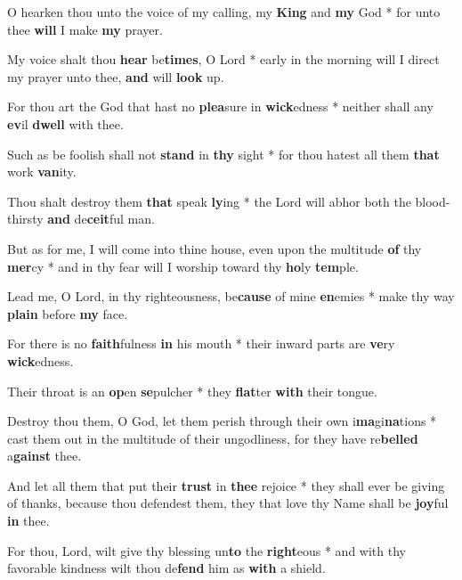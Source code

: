 \begin{multicols}{2}
	O hearken thou unto the voice of my calling, my \textbf{King} and \textbf{my} God * for unto thee \textbf{will} I make \textbf{my} prayer.
	
	My voice shalt thou \textbf{hear} be\textbf{times}, O Lord * early in the morning will I direct my prayer unto thee, \textbf{and} will \textbf{look} up.
	
	For thou art the God that hast no \textbf{plea}sure in \textbf{wick}edness * neither shall any \textbf{ev}il \textbf{dwell} with thee.
	
	Such as be foolish shall not \textbf{stand} in \textbf{thy} sight * for thou hatest all them \textbf{that} work \textbf{van}ity.
	
	Thou shalt destroy them \textbf{that} speak \textbf{ly}ing * the Lord will abhor both the blood-thirsty \textbf{and} de\textbf{ceit}ful man.
	
	But as for me, I will come into thine house, even upon the multitude \textbf{of} thy \textbf{mer}cy * and in thy fear will I worship toward thy \textbf{ho}ly \textbf{tem}ple.
	
	Lead me, O Lord, in thy righteousness, be\textbf{cause} of mine \textbf{en}emies * make thy way \textbf{plain} before \textbf{my} face.
	
	For there is no \textbf{faith}fulness \textbf{in} his mouth * their inward parts are \textbf{ve}ry \textbf{wick}edness.
	
	Their throat is an \textbf{op}en \textbf{se}pulcher * they \textbf{flat}ter \textbf{with} their tongue.
	
	Destroy thou them, O God, let them perish through their own i\textbf{ma}gi\textbf{na}tions * cast them out in the multitude of their ungodliness, for they have re\textbf{belled} a\textbf{gainst} thee.
	
	And let all them that put their \textbf{trust} in \textbf{thee} rejoice * they shall ever be giving of thanks, because thou defendest them, they that love thy Name shall be \textbf{joy}ful \textbf{in} thee.
	
	For thou, Lord, wilt give thy blessing un\textbf{to} the \textbf{right}eous * and with thy favorable kindness wilt thou de\textbf{fend} him as \textbf{with} a shield.
\end{multicols}